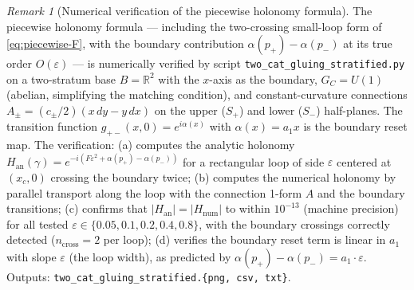 \documentclass[11pt,a4paper]{article}
\theoremstyle{plain}
\theoremstyle{definition}
\theoremstyle{remark}
\newtheorem{remark}[theorem]{Remark}
\newcommand{\RR}{\mathbb{R}}
\begin{document}
\begin{remark}[Numerical verification of the piecewise holonomy formula]
\label{rem:2cat-gluing-numeric}
The piecewise holonomy formula --- including the two-crossing
small-loop form of \eqref{eq:piecewise-F}, with the boundary
contribution $\alpha(p_+) - \alpha(p_-)$ at its true order
$O(\varepsilon)$ --- is numerically verified by script
\texttt{two\_cat\_gluing\_stratified.py} on a two-stratum base
$B = \RR^2$ with the $x$-axis as the boundary, $G_C = U(1)$ (abelian,
simplifying the matching condition), and constant-curvature connections
$A_\pm = (c_\pm/2)(x\,dy - y\,dx)$ on the upper ($S_+$) and lower
($S_-$) half-planes. The transition function $g_{+-}(x, 0) = e^{i \alpha(x)}$
with $\alpha(x) = a_1 x$ is the boundary reset map. The verification:
(a) computes the analytic holonomy $H_{\mathrm{an}}(\gamma) =
e^{-i(F \varepsilon^2 + \alpha(p_+) - \alpha(p_-))}$ for a rectangular
loop of side $\varepsilon$ centered at $(x_c, 0)$ crossing the boundary
twice; (b) computes the numerical holonomy by parallel transport along
the loop with the connection 1-form $A$ and the boundary transitions;
(c) confirms that $|H_{\mathrm{an}}| = |H_{\mathrm{num}}|$ to within
$10^{-13}$ (machine precision) for all tested $\varepsilon \in \{0.05,
0.1, 0.2, 0.4, 0.8\}$, with the boundary crossings correctly detected
($n_{\mathrm{cross}} = 2$ per loop); (d) verifies the boundary reset
term is linear in $a_1$ with slope $\varepsilon$ (the loop width), as
predicted by $\alpha(p_+) - \alpha(p_-) = a_1 \cdot \varepsilon$. Outputs:
\texttt{two\_cat\_gluing\_stratified.\{png, csv, txt\}}.
\end{remark}
\end{document}
